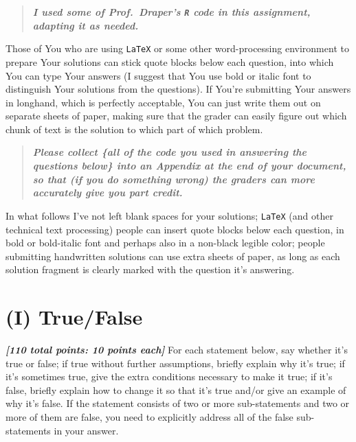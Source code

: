 \documentclass[12pt]{article}
\newcommand{\bi}[1]{\b{\i{#1}}}
\renewcommand{\b}[1]{\textbf{#1}}
\renewcommand{\i}[1]{\textit{#1}}
\renewcommand{\t}[1]{\texttt{#1}}
\begin{document}
\begin{quote}

\bi{I used some of Prof.~Draper's \texttt{R} code in this assignment, adapting it as needed.}

\end{quote}

Those of You who are using \texttt{LaTeX} or some other word-processing environment to prepare Your solutions can stick quote blocks below each question, into which You can type Your answers (I suggest that You use bold or italic font to distinguish Your solutions from the questions). If You're submitting Your answers in longhand, which is perfectly acceptable, You can just write them out on separate sheets of paper, making sure that the grader can easily figure out which chunk of text is the solution to which part of which problem.

\begin{quote}

\bi{Please collect \{all of the code you used in answering the questions below\} into an Appendix at the end of your document, so that (if you do something wrong) the graders can more accurately give you part credit.} 

\end{quote}

In what follows I've not left blank spaces for your solutions; \t{LaTeX} (and other technical text processing) people can insert quote blocks below each question, in bold or bold-italic font and perhaps also in a non-black legible color; people submitting handwritten solutions can use extra sheets of paper, as long as each solution fragment is clearly marked with the question it's answering. 

\section*{(I) True/False}

\bi{[110 total points: 10 points each]} For each statement below, say whether it's true or false; if true without further assumptions, briefly explain why it's true; if it's sometimes true, give the extra conditions necessary to make it true; if it's false, briefly explain how to change it so that it's true and/or give an example of why it's false. If the statement consists of two or more sub-statements and two or more of them are false, you need to explicitly address all of the false sub-statements in your answer.
\end{document}
